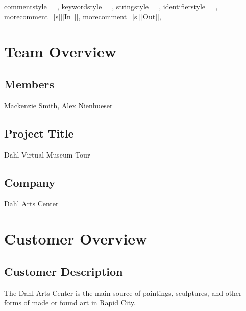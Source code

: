 



 {
commentstyle = \color{black},
keywordstyle = \color{black},
stringstyle = \color{black},
identifierstyle = \color{black},
morecomment=[s][\color{blue}]{In\ [}{]\:},
morecomment=[s][\color{red}]{Out[}{]\:},
 }

\pagestyle{empty}

\renewcommand{\familydefault}{\sfdefault}

%


\section*{Team Overview}
\hrulefill
\subsection*{Members}
Mackenzie Smith, Alex Nienhueser

\subsection*{Project Title}
Dahl Virtual Museum Tour

\subsection*{Company}
Dahl Arts Center

\section*{Customer Overview}
\hrulefill
\subsection*{Customer Description}
The Dahl Arts Center is the main source of paintings, sculptures, and other forms of made or found art in Rapid City.

